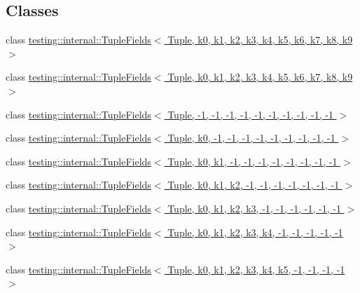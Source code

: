 \subsection*{Classes}
\begin{DoxyCompactItemize}
\item 
class \hyperlink{classtesting_1_1internal_1_1TupleFields}{testing\+::internal\+::\+Tuple\+Fields$<$ Tuple, k0, k1, k2, k3, k4, k5, k6, k7, k8, k9 $>$}
\item 
class \hyperlink{classtesting_1_1internal_1_1TupleFields}{testing\+::internal\+::\+Tuple\+Fields$<$ Tuple, k0, k1, k2, k3, k4, k5, k6, k7, k8, k9 $>$}
\item 
class \hyperlink{classtesting_1_1internal_1_1TupleFields_3_01Tuple_00_01-1_00_01-1_00_01-1_00_01-1_00_01-1_00_01-e023d39d312048e71832a898e9e07f70}{testing\+::internal\+::\+Tuple\+Fields$<$ Tuple, -\/1, -\/1, -\/1, -\/1, -\/1, -\/1, -\/1, -\/1, -\/1, -\/1 $>$}
\item 
class \hyperlink{classtesting_1_1internal_1_1TupleFields_3_01Tuple_00_01k0_00_01-1_00_01-1_00_01-1_00_01-1_00_01-d80da5b2d6dff94ddefe7f2fc2de778d}{testing\+::internal\+::\+Tuple\+Fields$<$ Tuple, k0, -\/1, -\/1, -\/1, -\/1, -\/1, -\/1, -\/1, -\/1, -\/1 $>$}
\item 
class \hyperlink{classtesting_1_1internal_1_1TupleFields_3_01Tuple_00_01k0_00_01k1_00_01-1_00_01-1_00_01-1_00_01-fb5812c507091ce72ac353453b83394d}{testing\+::internal\+::\+Tuple\+Fields$<$ Tuple, k0, k1, -\/1, -\/1, -\/1, -\/1, -\/1, -\/1, -\/1, -\/1 $>$}
\item 
class \hyperlink{classtesting_1_1internal_1_1TupleFields_3_01Tuple_00_01k0_00_01k1_00_01k2_00_01-1_00_01-1_00_01-d40fb0064dd627afc9c2b7f6513ffcb3}{testing\+::internal\+::\+Tuple\+Fields$<$ Tuple, k0, k1, k2, -\/1, -\/1, -\/1, -\/1, -\/1, -\/1, -\/1 $>$}
\item 
class \hyperlink{classtesting_1_1internal_1_1TupleFields_3_01Tuple_00_01k0_00_01k1_00_01k2_00_01k3_00_01-1_00_01-5ce285d726b58f03354f318c4712939e}{testing\+::internal\+::\+Tuple\+Fields$<$ Tuple, k0, k1, k2, k3, -\/1, -\/1, -\/1, -\/1, -\/1, -\/1 $>$}
\item 
class \hyperlink{classtesting_1_1internal_1_1TupleFields_3_01Tuple_00_01k0_00_01k1_00_01k2_00_01k3_00_01k4_00_01-111caa1fee55a41736499c292bb1a612}{testing\+::internal\+::\+Tuple\+Fields$<$ Tuple, k0, k1, k2, k3, k4, -\/1, -\/1, -\/1, -\/1, -\/1 $>$}
\item 
class \hyperlink{classtesting_1_1internal_1_1TupleFields_3_01Tuple_00_01k0_00_01k1_00_01k2_00_01k3_00_01k4_00_01k15c11b8436218f7eb1523adb30f3f284}{testing\+::internal\+::\+Tuple\+Fields$<$ Tuple, k0, k1, k2, k3, k4, k5, -\/1, -\/1, -\/1, -\/1 $>$}

\end{DoxyCompactItemize}
